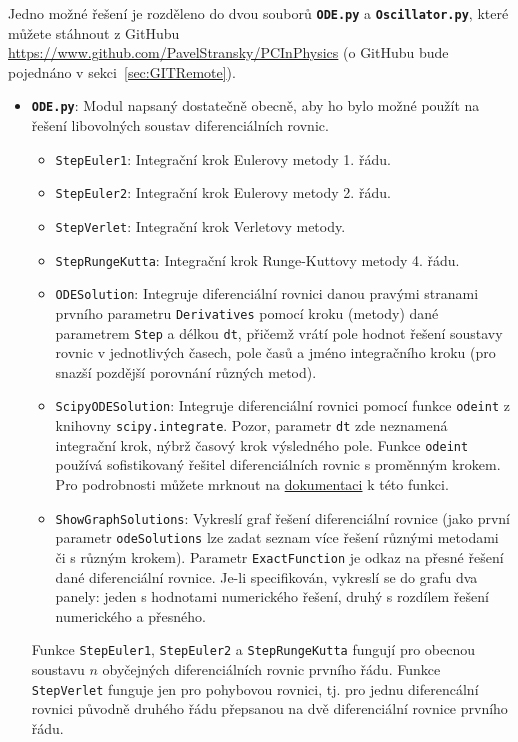 \documentclass[a4paper,11pt,twoside]{article}
\def\code#1{\textnormal{\texttt{#1}}}
\def\file#1{\textnormal{\textbf{\texttt{#1}}}}
\begin{document}
    \begin{solution}
        Jedno možné řešení je rozděleno do dvou souborů \file{ODE.py} a \file{Oscillator.py}, které můžete stáhnout z GitHubu \textnormal{\url{https://www.github.com/PavelStransky/PCInPhysics}}  (o GitHubu bude pojednáno v sekci~\ref{sec:GITRemote}). 

        \begin{itemize}
        \item \file{ODE.py}: 
            Modul napsaný dostatečně obecně, aby ho bylo možné použít na řešení libovolných soustav diferenciálních rovnic.
            \begin{itemize}
            \item \code{StepEuler1}: 
                Integrační krok Eulerovy metody 1. řádu.
            \item \code{StepEuler2}: 
                Integrační krok Eulerovy metody 2. řádu.
            \item \code{StepVerlet}: 
                Integrační krok Verletovy metody.
            \item \code{StepRungeKutta}: 
                Integrační krok Runge-Kuttovy metody 4. řádu.
            \item \code{ODESolution}: 
                Integruje diferenciální rovnici danou pravými stranami prvního parametru \code{Derivatives} pomocí kroku (metody) dané parametrem \code{Step} a délkou \code{dt}, přičemž vrátí pole hodnot řešení soustavy rovnic v jednotlivých časech, pole časů a jméno integračního kroku (pro snazší pozdější porovnání různých metod).
            \item \code{ScipyODESolution}: 
                Integruje diferenciální rovnici pomocí funkce \code{odeint} z knihovny \code{sci\-py.integrate}. 
                Pozor, parametr \code{dt} zde neznamená integrační krok, nýbrž časový krok výsledného pole.
                Funkce \code{odeint} používá sofistikovaný řešitel diferenciálních rovnic s proměnným krokem.
                Pro podrobnosti můžete mrknout na \href{https://docs.scipy.org/doc/scipy/reference/generated/scipy.integrate.odeint.html}{dokumentaci} k této funkci.

            \item \code{ShowGraphSolutions}:
                Vykreslí graf řešení diferenciální rovnice (jako první parametr \code{odeSolutions} lze zadat seznam více řešení různými metodami či s různým krokem).
                Parametr \code{ExactFunction} je odkaz na přesné řešení dané diferenciální rovnice. 
                Je-li specifikován, vykreslí se do grafu dva panely: jeden s hodnotami numerického řešení, druhý s rozdílem řešení numerického a přesného.                 
            \end{itemize}
            Funkce \code{StepEuler1}, \code{StepEuler2} a \code{StepRungeKutta} fungují pro obecnou soustavu $n$ obyčejných diferenciálních rovnic prvního řádu.
            Funkce \code{StepVerlet} funguje jen pro pohybovou rovnici, tj. pro jednu diferencální rovnici původně druhého řádu přepsanou na dvě diferenciální rovnice prvního řádu.


\end{itemize}
\end{solution}
\end{document}
